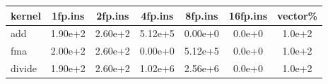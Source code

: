 %
\begin{tabular}{l|c|c|c|c|c|c}
\hline
kernel  & 1fp.ins  & 2fp.ins  & 4fp.ins  & 8fp.ins  & 16fp.ins  & vector\%
\\ \hline
add  	& 1.90e+2  & 2.60e+2  & 5.12e+5  & 0.00e+0  & 0.0e+0  & 1.0e+2
\\
fma  	& 2.00e+2  & 2.60e+2  & 0.00e+0  & 5.12e+5  & 0.0e+0  & 1.0e+2
\\
divide	& 1.90e+2  & 2.60e+2  & 1.02e+6  & 2.56e+6  & 0.0e+0  & 1.0e+2
\\ \hline
\end{tabular}
%
